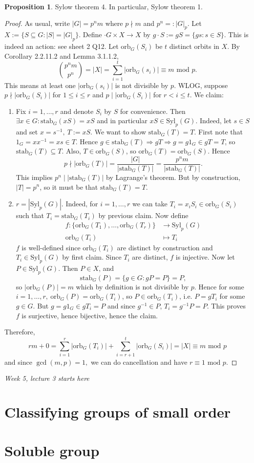 \documentclass[a4paper]{article}
\newcommand{\Syl}{\text{Syl}}
\newcommand{\orb}{\text{orb}}
\newcommand{\stab}{\text{stab}}
\newcommand{\Mod}{\text{ mod }}
\theoremstyle{definition}
\newtheorem{prop}[defn]{Proposition}
\begin{document}
\begin{prop}
Sylow theorem 4. In particular, Sylow theorem 1.
\end{prop}
\begin{proof}
As usual, write $|G|=p^n m$ where $p\nmid m$ and $p^n=:|G|_p$. Let $X:=\{S\subseteq G:|S|=|G|_p\}$. Define $\cdot G\times X\rightarrow X$ by $g\cdot S:=gS=\{gs:s\in S\}$. This is indeed an action: see sheet 2 Q12. Let $\orb_G(S_i)$ be $t$ distinct orbits in $X$. By Corollary 2.2.11.2 and Lemma 3.1.1.2,
\[
\binom{p^n m}{p^n}=|X|=\sum_{i=1}^t |\orb_G(s_i)| \equiv m\Mod p.
\]
This means at least one $|\orb_G(s_i)|$ is not divisible by $p$. WLOG, suppose $p\nmid |\orb_G(S_i)|$ for $1\leq i\leq r$ and $p\mid |\orb_G(S_i)|$ for $r< i\leq t$. We claim:
\begin{enumerate}
\item Fix $i=1,\ldots,r$ and denote $S_i$ by $S$ for convenience. Then $\exists x\in G:\stab_G(xS)=xS$ and in particular $xS\in\Syl_p(G)$. Indeed, let $s\in S$ and set $x=s^{-1},\ T:=xS$. We want to show $\stab_G(T)=T$. First note that $1_G=xx^{-1}=xs\in T$. Hence $g\in\stab_G(T)\Rightarrow gT\Rightarrow g=g1_G\in gT=T$, so $\stab_G(T)\subseteq T$. Also, $T\in\orb_G(S)$, so $\orb_G(T)=\orb_G(S)$. Hence
\[
p\nmid |\orb_G(T)|=\frac{|G|}{|\stab_G(T)|}=\frac{p^n m}{|\stab_G(T)|}.
\]
This implies $p^n\mid |\stab_G(T)|$ by Lagrange's theorem. But by construction, $|T|=p^n$, so it must be that $\stab_G(T)=T$.
\item $r=|\Syl_p(G)|$. Indeed, for $i=1,\ldots,r$ we can take $T_i=x_i S_i\in\orb_G(S_i)$ such that $T_i=\stab_G(T_i)$ by previous claim. Now define
\[
\begin{aligned}
f:\{\orb_G(T_1),\ldots,\orb_G(T_r)\} &\rightarrow \Syl_p(G) \\
\orb_G(T_i) &\mapsto T_i
\end{aligned}
\]
$f$ is well-defined since $\orb_G(T_i)$ are distinct by construction and $T_i\in\Syl_p(G)$ by first claim. Since $T_i$ are distinct, $f$ is injective. Now let $P\in\Syl_p(G)$. Then $P\in X$, and
\[
\stab_G(P)=\{g\in G:gP=P\}=P,
\]
so $|\orb_G(P)|=m$ which by definition is not divisible by $p$. Hence for some $i=1,\ldots,r,\ \orb_G(P)=\orb_G(T_i)$, so $P\in\orb_G(T_i)$, i.e. $P=gT_i$ for some $g\in G$. But $g=g1_G\in gT_i=P$ and since $g^{-1}\in P$, $T_i=g^{-1}P=P$. This proves $f$ is surjective, hence bijective, hence the claim.
\end{enumerate}
Therefore,
\[
rm+0=\sum_{i=1}^r |\orb_G(T_i)|+\sum_{i=r+1}^t |\orb_G(S_i)|=|X|\equiv m\Mod p
\]
and since $\gcd(m,p)=1,$ we can do cancellation and have $r\equiv 1\Mod p$.
\end{proof}



\begin{flushright}
\textit{Week 5, lecture 3 starts here}
\end{flushright}

\section{Classifying groups of small order}

\section{Soluble group}
\end{document}
